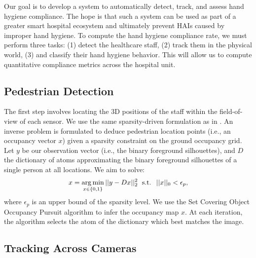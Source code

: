 \documentclass[twoside,11pt]{article}
\DeclareMathOperator*{\argmin}{arg\,min}
\begin{document}
Our goal is to develop a system to automatically detect, track, and assess hand hygiene compliance.
The hope is that such a system can be used as part of a greater smart hospital ecosystem and ultimately prevent HAIs caused by improper hand hygiene.
To compute the hand hygiene compliance rate, we must perform three tasks: (1) detect the healthcare staff, (2) track them in the physical world, (3) and classify their hand hygiene behavior.
This will allow us to compute quantitative compliance metrics across the hospital unit.

\subsection{Pedestrian Detection}

The first step involves locating the 3D positions of the staff within the field-of-view of each sensor.
We use the same sparsity-driven formulation as in \cite{golbabaee2014scoop}.
An inverse problem is formulated to deduce pedestrian location points (i.e., an occupancy vector $x$) given a sparsity constraint on the ground occupancy grid.
Let $y$ be our observation vector (i.e., the binary foreground silhouettes), and $D$ the dictionary of atoms approximating the binary foreground silhouettes of a single person at all locations.
We aim to solve:
\begin{equation}\label{eq:human_detection}
x = \argmin_{x\in\{0,1\}} ||y - D x||_2^2 \text{\; s.t. \;} ||x||_0 < \epsilon_p,
\end{equation}
where $\epsilon_p$ is an upper bound of the sparsity level.
We use the Set Covering Object Occupancy Pursuit algorithm \citep{golbabaee2014scoop} to infer the occupancy map $x$.
At each iteration, the algorithm selects the atom of the dictionary which best matches the image.

\subsection{Tracking Across Cameras}\label{tracklet_generation}
\end{document}
